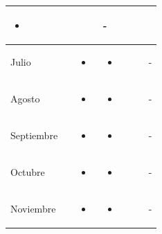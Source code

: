 \documentclass[landscape, a4paper, 10pt]{article}
\newcommand{\smallcellwidth}{0.7in}
\newcommand{\normalcellwidth}{1.2in}
\newcommand{\bigcellwidth}{2.0in}
\begin{document}
\begin{longtable}{|m{\smallcellwidth}|p{\normalcellwidth}|p{\bigcellwidth}|p{\bigcellwidth}|p{\normalcellwidth}|p{\normalcellwidth}|p{\normalcellwidth}|}
\begin{itemize}
			\item 
		\end{itemize} &
		  &
		  &
		 - \\
		\hline
		Julio &
		 &
		\begin{itemize}
			\item 
		\end{itemize} &
		\begin{itemize}
			\item 
		\end{itemize} &
		  &
		  &
		 - \\
		\hline
		Agosto &
		 &
		\begin{itemize}
			\item 
		\end{itemize} &
		\begin{itemize}
			\item 
		\end{itemize} &
		  &
		  &
		 - \\
		\hline
		Septiembre &
		 &
		\begin{itemize}
			\item 
		\end{itemize} &
		\begin{itemize}
			\item 
		\end{itemize} &
		  &
		  &
		 - \\
		\hline
		Octubre &
		 &
		\begin{itemize}
			\item 
		\end{itemize} &
		\begin{itemize}
			\item 
		\end{itemize} &
		  &
		  &
		 - \\
		\hline
		Noviembre &
		 &
		\begin{itemize}
			\item 
		\end{itemize} &
		\begin{itemize}
			\item 
		\end{itemize} &
		  &
		  &
		 - \\
		\hline

	\end{longtable}
	\pagebreak[4]
\end{document}
